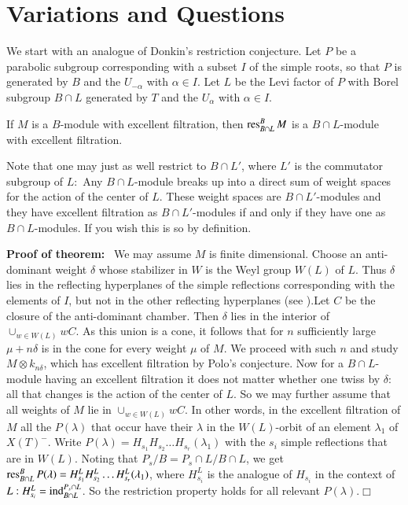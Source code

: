 \section{Variations and Questions}\label{chap6-sec6.3}

We start with an analogue of Donkin's restriction conjecture. Let $P$
be a parabolic subgroup corresponding with a subset $I$ of the simple
roots, so that $P$ is generated by $B$ and the $U_{-\alpha}$ with
$\alpha\in I$. Let $L$ be the Levi factor of $P$ with Borel subgroup
$B\cap L$ generated by $T$ and the $U_{\alpha}$ with $\alpha\in I$.

\begin{theorem}\label{chap6-thm6.3.1}
If $M$ is a $B$-module with excellent filtration, then
$\res^{B}_{B\cap L}\break M$ is a $B\cap L$-module with excellent filtration.
\end{theorem}

\begin{remark}\label{chap6-rem6.3.2}
Note that one may just as well restrict to $B\cap L'$, where $L'$ is
the commutator subgroup of $L:$ Any $B\cap L$-module breaks up into a
direct sum of weight spaces for the action of the center of $L$. These
weight spaces are $B\cap L'$-modules and they have excellent
filtration as $B\cap L'$-modules if and only if they have one as
$B\cap L$-modules. If you wish this is so by definition.
\end{remark}

\noindent
{\bf Proof of theorem:}~ We may assume $M$ is finite
dimensional. Choose an anti-dominant weight $\delta$ whose stabilizer
in $W$ is the Weyl group $W(L)$ of $L$. Thus $\delta$ lies in the
reflecting hyperplanes of the simple reflections corresponding with
the elements of $I$, but not in the other reflecting hyperplanes (see
\cite[1.12]{key9}).\pageoriginale Let\label{page65} $C$ be the closure of the
anti-dominant chamber. Then $\delta$ lies in the interior of
$\cup_{w\in W(L)}wC$. As this union is a cone, it follows that for $n$
sufficiently large $\mu+n\delta$ is in the cone for every weight $\mu$
of $M$. We proceed with such $n$ and study $M\otimes k_{n\delta}$,
which has excellent filtration by Polo's conjecture. Now for a $B\cap
L$-module having an excellent filtration it does not matter whether
one twiss by $\delta:$ all that changes is the action of the center of
$L$. So we may further assume that all weights of $M$ lie in
$\cup_{w\in W(L)}wC$. In other words, in the excellent filtration of
$M$ all the $P(\lambda)$ that occur have their $\lambda$ in the
$W(L)$-orbit of an element $\lambda_{1}$ of $X(T)^{-}$. Write
  $P(\lambda)=H_{s_{1}}H_{s_{2}}\ldots H_{s_{r}}(\lambda_{1})$ with
  the $s_{i}$ simple reflections that are in $W(L)$. Noting that
  $P_{s}/B=P_{s}\cap L/B\cap L$, we get $\operatorname{res}^{B}_{B\cap
    L}P(\lambda)=H^{L}_{s_{1}}H^{L}_{s_{2}}\ldots
  H^{L}_{s_{r}}(\lambda_{1})$, where $H^{L}_{s_{i}}$ is the analogue
  of $H_{s_{i}}$ in the context of $L:H^{L}_{s_{i}}=\operatorname{ind}^{P_{s}\cap
    L}_{B\cap L}$. So the restriction property holds for all relevant
  $P(\lambda)$.\hfill$\Box$
 
